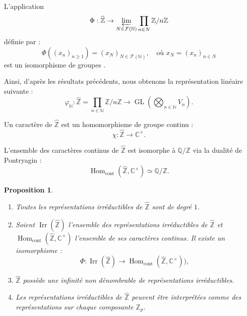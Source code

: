 \documentclass[9pt]{beamer}
\newtheorem{proposition}{Proposition}
\begin{document}
\begin{frame}
	\begin{theorem}
	L'application
	\[
	\Phi : \widehat{\mathbb{Z}} \to \varprojlim_{N \in \mathcal{F}(\mathbb{N})} \prod_{n \in N} \mathbb{Z}/n\mathbb{Z}
	\]
	définie par :
	\[
	\Phi((x_n)_{n \geq 1}) = (x_N)_{N \in \mathcal{F}(\mathbb{N})}, \quad \text{où } x_N = (x_n)_{n \in N}
	\]
	est un isomorphisme de groupes .
\end{theorem}


Ainsi, d’après les résultats précédents, nous obtenons la représentation linéaire suivante :
\[
\varphi_{\mathbb{N}} : \widehat{\mathbb{Z}} = \prod_{n \in \mathbb{N}} \mathbb{Z}/n\mathbb{Z} \longrightarrow \operatorname{GL} \left( \bigotimes_{n \in \mathbb{N}} V_n \right).
\]
\end{frame}

\begin{frame}
\begin{definition}
	Un caractère de $\widehat{\mathbb{Z}}$ est un homomorphisme de groupe continu :
	\[
	\chi : \widehat{\mathbb{Z}} \to \mathbb{C}^\times.
	\]
	
\end{definition}

\begin{theorem}
	L'ensemble des caractères continus de $\widehat{\mathbb{Z}}$ est isomorphe à $\mathbb{Q}/\mathbb{Z}$ via la dualité de Pontryagin :
	\[
	\operatorname{Hom}_{\text{cont}}(\widehat{\mathbb{Z}}, \mathbb{C}^\times) \simeq \mathbb{Q}/\mathbb{Z}.
	\]
\end{theorem}


\begin{proposition}
	\begin{enumerate} [label=\roman*)] 
		\item Toutes les représentations irréductibles de $\widehat{\mathbb{Z}}$ sont de degré $1$.
		\item Soient $\operatorname{Irr}(\widehat{\mathbb{Z}})$ l'ensemble des représentations irréductibles de $\widehat{\mathbb{Z}}$ et $\operatorname{Hom}_{\text{cont}}(\widehat{\mathbb{Z}}, \mathbb{C}^\times)$ l'ensemble de ses caractères continus. Il existe un isomorphisme :
		\[
		\Phi : \operatorname{Irr}(\widehat{\mathbb{Z}}) \to \operatorname{Hom}_{\text{cont}}(\widehat{\mathbb{Z}}, \mathbb{C}^\times)),
		\]
		\item $\widehat{\mathbb{Z}}$ possède une infinité non dénombrable de représentations irréductibles.
		\item Les représentations irréductibles de $\widehat{\mathbb{Z}}$ peuvent être interprétées comme des représentations sur chaque composante $\mathbb{Z}_p$.
	\end{enumerate}
\end{proposition}

\end{frame}
\end{document}
